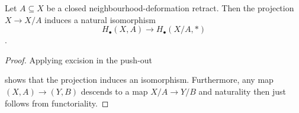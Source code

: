 \begin{lemma}
    Let $A \subseteq X$ be a closed neighbourhood-deformation retract. Then the projection $X \to X/A$ induces a natural isomorphism $$H_\bullet(X,A) \to H_\bullet(X/A,\ast)$$.
\end{lemma}
\begin{proof}
    Applying excision in the push-out
    \begin{center}
    \end{center}
    shows that the projection induces an isomorphism. Furthermore, any map $(X,A) \to (Y,B)$ descends to a map $X/A \to Y/B$ and naturality then just follows from functoriality. 

\end{proof}